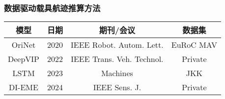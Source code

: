 \begin{frame}

	\frametitle{数据驱动载具航迹推算方法}
	
	{\small
		\begin{tabular*}{\linewidth}{@{\extracolsep{\fill}}cccc}
			\toprule
			\multicolumn{1}{c}{模型} & 日期 & 期刊/会议 & 数据集 \\
			\midrule
			OriNet  & 2020 & IEEE Robot. Autom. Lett.  & EuRoC MAV \\
			DeepVIP & 2022 & IEEE Trans. Veh. Technol. & Private   \\ %
			LSTM    & 2023 & Machines                  & JKK       \\
			DI-EME  & 2024 & IEEE Sens. J.             & Private   \\
			\bottomrule
		\end{tabular*}       
	}
	
\end{frame}

